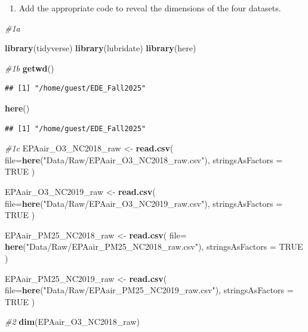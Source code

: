 \documentclass[
]{article}
\newenvironment{Shaded}{\begin{snugshade}}{\end{snugshade}}
\newcommand{\AttributeTok}[1]{\textcolor[rgb]{0.13,0.29,0.53}{#1}}
\newcommand{\CommentTok}[1]{\textcolor[rgb]{0.56,0.35,0.01}{\textit{#1}}}
\newcommand{\ConstantTok}[1]{\textcolor[rgb]{0.56,0.35,0.01}{#1}}
\newcommand{\FunctionTok}[1]{\textcolor[rgb]{0.13,0.29,0.53}{\textbf{#1}}}
\newcommand{\NormalTok}[1]{#1}
\newcommand{\OtherTok}[1]{\textcolor[rgb]{0.56,0.35,0.01}{#1}}
\newcommand{\StringTok}[1]{\textcolor[rgb]{0.31,0.60,0.02}{#1}}
\providecommand{\tightlist}{%
  \setlength{\itemsep}{0pt}\setlength{\parskip}{0pt}}
\begin{document}
\begin{enumerate}
\def\labelenumi{\arabic{enumi}.}
\setcounter{enumi}{1}
\tightlist
\item
  Add the appropriate code to reveal the dimensions of the four
  datasets.
\end{enumerate}

\begin{Shaded}
\begin{Highlighting}[]
\CommentTok{\#1a }

\FunctionTok{library}\NormalTok{(tidyverse)}
\FunctionTok{library}\NormalTok{(lubridate)}
\FunctionTok{library}\NormalTok{(here)}



\CommentTok{\#1b }
\FunctionTok{getwd}\NormalTok{()}
\end{Highlighting}
\end{Shaded}

\begin{verbatim}
## [1] "/home/guest/EDE_Fall2025"
\end{verbatim}

\begin{Shaded}
\begin{Highlighting}[]
\FunctionTok{here}\NormalTok{()}
\end{Highlighting}
\end{Shaded}

\begin{verbatim}
## [1] "/home/guest/EDE_Fall2025"
\end{verbatim}

\begin{Shaded}
\begin{Highlighting}[]
\CommentTok{\#1c }
\NormalTok{EPAair\_O3\_NC2018\_raw }\OtherTok{\textless{}{-}} \FunctionTok{read.csv}\NormalTok{(}
  \AttributeTok{file=}\FunctionTok{here}\NormalTok{(}\StringTok{"Data/Raw/EPAair\_O3\_NC2018\_raw.csv"}\NormalTok{), }
  \AttributeTok{stringsAsFactors =} \ConstantTok{TRUE}
\NormalTok{)}

\NormalTok{EPAair\_O3\_NC2019\_raw }\OtherTok{\textless{}{-}} \FunctionTok{read.csv}\NormalTok{(}
  \AttributeTok{file=}\FunctionTok{here}\NormalTok{(}\StringTok{"Data/Raw/EPAair\_O3\_NC2019\_raw.csv"}\NormalTok{),}
  \AttributeTok{stringsAsFactors =} \ConstantTok{TRUE}
\NormalTok{)}


\NormalTok{EPAair\_PM25\_NC2018\_raw }\OtherTok{\textless{}{-}} \FunctionTok{read.csv}\NormalTok{(}
  \AttributeTok{file=} \FunctionTok{here}\NormalTok{(}\StringTok{"Data/Raw/EPAair\_PM25\_NC2018\_raw.csv"}\NormalTok{), }
  \AttributeTok{stringsAsFactors =} \ConstantTok{TRUE}
\NormalTok{)}

\NormalTok{EPAair\_PM25\_NC2019\_raw }\OtherTok{\textless{}{-}} \FunctionTok{read.csv}\NormalTok{(}
  \AttributeTok{file=}\FunctionTok{here}\NormalTok{(}\StringTok{"Data/Raw/EPAair\_PM25\_NC2019\_raw.csv"}\NormalTok{), }
  \AttributeTok{stringsAsFactors =} \ConstantTok{TRUE}
\NormalTok{)}


\CommentTok{\#2 }
\FunctionTok{dim}\NormalTok{(EPAair\_O3\_NC2018\_raw) }
\end{Highlighting}
\end{Shaded}
\end{document}
